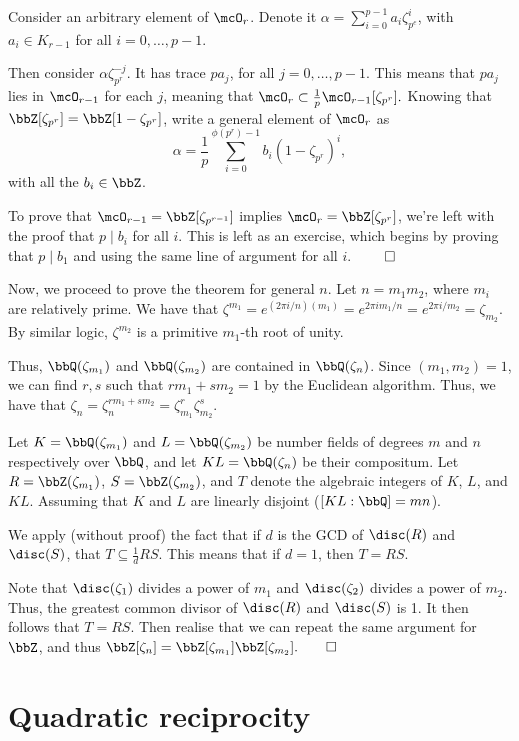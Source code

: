 \documentclass[a4paper, 12pt,oneside,openany]{book}
\begin{document}
Consider an arbitrary element of $\mcO_r$. Denote it $\alpha=\sum\limits_{i=0}^{p-1}a_i\zeta_{p^e}^i$, with $a_i \in K_{r-1} $ for all $i=0, \dots, p-1$.

Then consider $\alpha \zeta_{p^r}^{-j}$. It has trace $pa_j$, for all $j=0, \dots, p-1$. This means that $pa_j$ lies in $\mcO_{r-1}$ for each $j$, meaning that $\mcO_r \subset \frac{1}{p} \mcO_{r-1}[\zeta_{p^r}].$ Knowing that $\bbZ[\zeta_{p^r}]=\bbZ[1-\zeta_{p^r}]$, write a general element of $\mcO_r$ as $$\alpha = \frac{1}{p}\sum\limits_{i=0}^{\phi(p^r)-1} b_i(1-\zeta_{p^r})^i,$$ with all the $b_i\in\bbZ$. 

To prove that $\mcO_{r-1} = \bbZ[\zeta_{p^{r-1}}]$ implies $\mcO_r = \bbZ[\zeta_{p^r}]$, we're left with the proof that $p\mid b_i$ for all $i$. This is left as an exercise, which begins by proving that $p \mid b_1$ and using the same line of argument for all $i$. $\qed$

Now, we proceed to prove the theorem for general $n$. Let $n=m_1m_2$, where $m_i$ are relatively prime. We have that $\zeta^{m_1}=e^{(2\pi i /n)(m_1)}=e^{2\pi i m_1/n} = e^{2\pi i /m_2}=\zeta_{m_2}$. By similar logic, $\zeta^{m_2}$ is a primitive $m_1$-th root of unity.

Thus, $\bbQ(\zeta_{m_1})$ and $\bbQ(\zeta_{m_2})$ are contained in $\bbQ(\zeta_n)$. Since $(m_1, m_2)=1$, we can find $r,s$ such that $rm_1+sm_2=1$ by the Euclidean algorithm. Thus, we have that $\zeta_n=\zeta_n^{rm_1+sm_2}=\zeta_{m_1}^r\zeta_{m_2}^s$.

Let $K=\bbQ(\zeta_{m_1})$ and $L=\bbQ(\zeta_{m_2})$ be number fields of degrees $m$ and $n$ respectively over $\bbQ$, and let $KL=\bbQ(\zeta_n)$ be their compositum. Let $R=\bbZ(\zeta_{m_1})$, $S=\bbZ(\zeta_{m_2})$, and $T$ denote the algebraic integers of $K$, $L$, and $KL$. Assuming that $K$ and $L$ are linearly disjoint ($[KL:\bbQ]=mn$). 

We apply (without proof) the fact that if $d$ is the GCD of $\disc(R)$ and $\disc(S)$, that $T \subseteq \frac{1}{d}RS$. This means that if $d=1$, then $T=RS$.  

Note that $\disc(\zeta_1)$ divides a power of $m_1$ and $\disc(\zeta_2)$ divides a power of $m_2$. Thus, the greatest common divisor of $\disc(R)$ and $\disc(S)$ is 1. It then follows that $T=RS$. Then realise that we can repeat the same argument for $\bbZ$, and thus $\bbZ[\zeta_n]=\bbZ[\zeta_{m_1}]\bbZ[\zeta_{m_2}]. \qed$ 


\section{Quadratic reciprocity}
\end{document}
